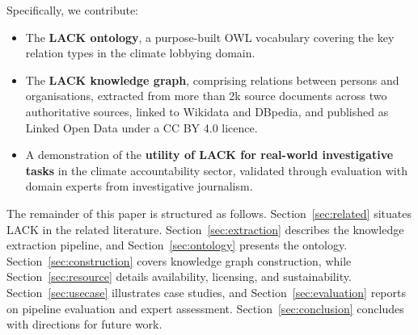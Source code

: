 Specifically, we contribute:
\begin{itemize}
    \item The \textbf{LACK ontology}, a purpose-built OWL vocabulary covering
    the key relation types in the climate lobbying domain.
    \item The \textbf{LACK knowledge graph}, comprising relations between persons and organisations, extracted from more than 2k source documents across two authoritative sources, linked to Wikidata and DBpedia,
    and published as Linked Open Data under a CC BY 4.0 licence.
    \item A demonstration of the \textbf{utility of LACK for real-world investigative tasks} in the climate accountability sector, validated through evaluation with domain experts from investigative journalism.
\end{itemize}

The remainder of this paper is structured as follows.
Section~\ref{sec:related} situates LACK in the related literature. Section~\ref{sec:extraction} describes the knowledge extraction pipeline, and Section~\ref{sec:ontology} presents the ontology. Section~\ref{sec:construction} covers knowledge graph construction, while Section~\ref{sec:resource} details availability, licensing, and sustainability. Section~\ref{sec:usecase} illustrates case studies, and Section~\ref{sec:evaluation} reports on pipeline evaluation and expert assessment. Section~\ref{sec:conclusion} concludes with directions for future work.
